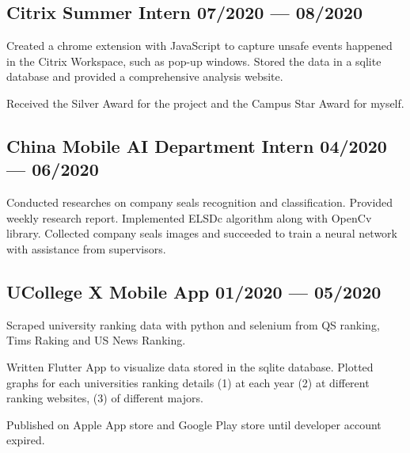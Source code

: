 \subsection{{
    Citrix Summer Intern
    \hfill 07/2020 --- 08/2020
}}
\begin{zitemize}
    \item   Created a chrome extension with JavaScript to capture unsafe events
            happened in the Citrix Workspace, such as pop-up windows. 
            Stored the data in a sqlite database and provided a comprehensive
            analysis website.
    \item   Received the Silver Award for the project and the Campus Star Award for myself.
\end{zitemize}


\subsection{{
    China Mobile AI Department Intern
    \hfill 04/2020 --- 06/2020
}}
\begin{zitemize}
    \item   Conducted researches on company seals recognition and classification.
            Provided weekly research report.
            Implemented ELSDc algorithm along with OpenCv library. 
            Collected company seals images and succeeded to train a neural network with assistance from supervisors.
\end{zitemize}


\subsection{{
    UCollege X Mobile App
    \hfill 01/2020 --- 05/2020
}}
\begin{zitemize}
    \item   Scraped university ranking data with python and selenium from QS ranking,
            Tims Raking and US News Ranking.
    \item   Written Flutter App to visualize data stored in the sqlite database.
            Plotted graphs for each universities ranking details (1) at each year
            (2) at different ranking websites, (3) of different majors.
    \item   Published on Apple App store and Google Play store until developer account expired.
\end{zitemize}
